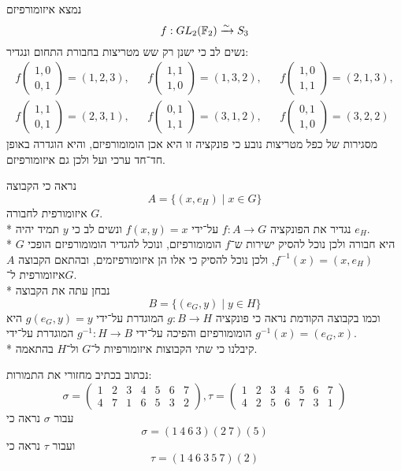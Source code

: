 \Subquestion{}
נמצא איזומורפיזם
\[
	f : GL_2(\mathbb{F}_2) \xrightarrow{\sim} S_3
\]
נשים לב כי ישנן רק שש מטריצות בחבורת התחום ונגדיר:
\begin{align*}
	f\begin{pmatrix}
		1, 0 \\
		0, 1
	\end{pmatrix} = (1, 2, 3),
	&& f\begin{pmatrix}
		1, 1 \\
		1, 0
	\end{pmatrix} = (1, 3, 2),
	&& f\begin{pmatrix}
		1, 0 \\
		1, 1
	\end{pmatrix} = (2, 1, 3), \\
	f\begin{pmatrix}
		1, 1 \\
		0, 1
	\end{pmatrix} = (2, 3, 1),
	&& f\begin{pmatrix}
		0, 1 \\
		1, 1
	\end{pmatrix} = (3, 1, 2),
	&& f\begin{pmatrix}
		0, 1 \\
		1, 0
	\end{pmatrix} = (3, 2, 2)
\end{align*}
מסגירות של כפל מטריצות נובע כי פונקציה זו היא אכן הומומורפיזם, והיא הוגדרה באופן חד־חד ערכי ועל ולכן גם איזומורפיזם.

\Subquestion{}
נראה כי הקבוצה
\[
	A = \{(x, e_H) \mid x \in G \}
\]
איזומורפית לחבורה $G$. \\*
נגדיר את הפונקציה $f : A \to G$ על־ידי $f(x, y) = x$ ונשים לב כי $y$ תמיד יהיה $e_H$. \\*
$G$ היא חבורה ולכן נוכל להסיק ישירות ש־$f$ הומומורפיזם, ונוכל להגדיר הומומורפיזם הופכי $f^{-1}(x) = (x, e_H)$, ולכן נוכל להסיק כי אלו הן איזומורפיזמים, ובהתאם הקבוצה $A$ איזומורפית ל־$G$. \\*
נבחן עתה את הקבוצה
\[
	B = \{(e_G, y) \mid y \in H\}
\]
וכמו בקבוצה הקודמת נראה כי פונקציה $g : B \to H$ המוגדרת על־ידי $g(e_G, y) = y$ היא הומומורפיזם והפיכה על־ידי $g^{-1} : H \to B$ המוגדרת על־ידי $g^{-1}(x) = (e_G, x)$. \\*
קיבלנו כי שתי הקבוצות איזומורפיות ל־$G$ ול־$H$ בהתאמה.

\Question{}
\Subquestion{}
נכתוב בכתיב מחזורי את התמורות:
\[
	\sigma = \begin{pmatrix}
		1 & 2 & 3 & 4 & 5 & 6 & 7 \\
		4 & 7 & 1 & 6 & 5 & 3 & 2
	\end{pmatrix},
	\tau = \begin{pmatrix}
		1 & 2 & 3 & 4 & 5 & 6 & 7 \\
		4 & 2 & 5 & 6 & 7 & 3 & 1
	\end{pmatrix}
\]
עבור $\sigma$ נראה כי
\[
	\sigma = (1 \  4 \  6 \  3)(2 \  7)(5)
\]
ועבור $\tau$ נראה כי
\[
	\tau = (1 \ 4 \ 6 \ 3 \ 5 \ 7)(2)
\]

